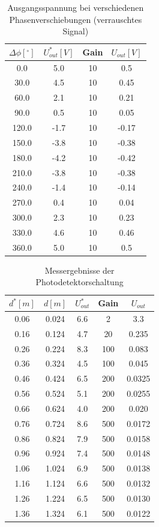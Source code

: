 \documentclass[11pt]{article}
\begin{document}
\begin{table}[h!]
\centering
\begin{tabular}{|c|c|c|c|}
\hline
$\Delta \phi [^\circ]$ & $U_{out}^* [V]$ & Gain & $U_{out} [V]$ \\
\hline
0.0 & 5.0 & 10 & 0.5\\
30.0 & 4.5 & 10 & 0.45\\
60.0 & 2.1 & 10 & 0.21\\
90.0 & 0.5 & 10 & 0.05\\
120.0 & -1.7 & 10 & -0.17\\
150.0 & -3.8 & 10 & -0.38\\
180.0 & -4.2 & 10 & -0.42\\
210.0 & -3.8 & 10 & -0.38\\
240.0 & -1.4 & 10 & -0.14\\
270.0 & 0.4 & 10 & 0.04\\
300.0 & 2.3 & 10 & 0.23\\
330.0 & 4.6 & 10 & 0.46\\
360.0 & 5.0 & 10 & 0.5\\
\hline
\end{tabular}
\label{data2}
\caption{Ausgangsspannung bei verschiedenen Phasenverschiebungen \newline (verrauschtes Signal)}
\end{table}


\begin{table}[h!]
\centering
\begin{tabular}{|c|c|c|c|c|}
\hline
$d^* [m]$ & $d [m]$ & $U_{out}^*$ & Gain & $U_{out}$ \\
\hline
0.06 & 0.024 & 6.6 & 2 & 3.3\\
0.16 & 0.124 & 4.7 & 20 & 0.235\\
0.26 & 0.224 & 8.3 & 100 & 0.083\\
0.36 & 0.324 & 4.5 & 100 & 0.045\\
0.46 & 0.424 & 6.5 & 200 & 0.0325\\
0.56 & 0.524 & 5.1 & 200 & 0.0255\\
0.66 & 0.624 & 4.0 & 200 & 0.020\\
0.76 & 0.724 & 8.6 & 500 & 0.0172\\
0.86 & 0.824 & 7.9 & 500 & 0.0158\\
0.96 & 0.924 & 7.4 & 500 & 0.0148\\
1.06 & 1.024 & 6.9 & 500 & 0.0138\\
1.16 & 1.124 & 6.6 & 500 & 0.0132\\
1.26 & 1.224 & 6.5 & 500 & 0.0130\\
1.36 & 1.324 & 6.1 & 500 & 0.0122\\
\hline
\end{tabular}
\label{data}
\caption{Messergebnisse der Photodetektorschaltung}
\end{table}
\end{document}
